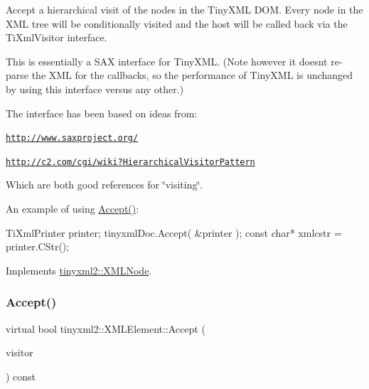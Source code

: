 Accept a hierarchical visit of the nodes in the Tiny\+X\+ML D\+OM. Every node in the X\+ML tree will be conditionally visited and the host will be called back via the Ti\+Xml\+Visitor interface.

This is essentially a S\+AX interface for Tiny\+X\+ML. (Note however it doesn\textquotesingle{}t re-\/parse the X\+ML for the callbacks, so the performance of Tiny\+X\+ML is unchanged by using this interface versus any other.)

The interface has been based on ideas from\+:


\begin{DoxyItemize}
\item \href{http://www.saxproject.org/}{\tt http\+://www.\+saxproject.\+org/}
\item \href{http://c2.com/cgi/wiki?HierarchicalVisitorPattern}{\tt http\+://c2.\+com/cgi/wiki?\+Hierarchical\+Visitor\+Pattern}
\end{DoxyItemize}

Which are both good references for \char`\"{}visiting\char`\"{}.

An example of using \hyperlink{classtinyxml2_1_1XMLElement_a9b2119831e8b85827d5d3e5076788e4a}{Accept()}\+: \begin{DoxyVerb}TiXmlPrinter printer;
tinyxmlDoc.Accept( &printer );
const char* xmlcstr = printer.CStr();
\end{DoxyVerb}
 

Implements \hyperlink{classtinyxml2_1_1XMLNode_a81e66df0a44c67a7af17f3b77a152785}{tinyxml2\+::\+X\+M\+L\+Node}.

\mbox{\label{classtinyxml2_1_1XMLElement_a3ea8a40e788fb9ad876c28a32932c6d5}} 
\subsubsection{\texorpdfstring{Accept()}{Accept()}\hspace{0.1cm}{\footnotesize\ttfamily [2/2]}}
{\footnotesize\ttfamily virtual bool tinyxml2\+::\+X\+M\+L\+Element\+::\+Accept (\begin{DoxyParamCaption}\item[{\hyperlink{classtinyxml2_1_1XMLVisitor}{X\+M\+L\+Visitor} $\ast$}]{visitor }\end{DoxyParamCaption}) const\hspace{0.3cm}{\ttfamily [virtual]}}

